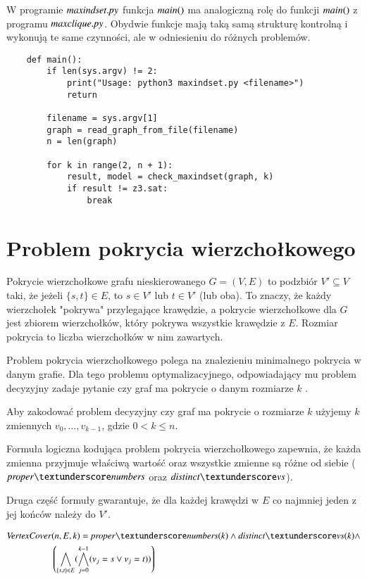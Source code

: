 

W programie ${\mathit{maxindset.py}}$ funkcja ${\mathit{main()}}$ ma analogiczną rolę do funkcji ${\mathit{main()}}$ z programu ${\mathit{maxclique.py}}$. Obydwie funkcje mają taką samą strukturę kontrolną i wykonują te same czynności, ale w odniesieniu do różnych problemów. 

\begin{lstlisting}
	def main():
		if len(sys.argv) != 2:
			print("Usage: python3 maxindset.py <filename>")
			return
		
		filename = sys.argv[1]
		graph = read_graph_from_file(filename)
		n = len(graph)
		
		for k in range(2, n + 1):
			result, model = check_maxindset(graph, k)
			if result != z3.sat:
				break
\end{lstlisting}


\section{Problem pokrycia wierzchołkowego}
Pokrycie wierzchołkowe grafu nieskierowanego $G = (V, E)$ to podzbiór $V' \subseteq V$ taki, że jeżeli $\{s, t\} \in E$, to $s \in V'$ lub $t \in V'$ (lub oba). To znaczy, że każdy wierzchołek "pokrywa" przylegające krawędzie, a pokrycie wierzchołkowe dla \(G\) jest zbiorem wierzchołków, który pokrywa wszystkie krawędzie z \(E\). Rozmiar pokrycia to liczba wierzchołków w nim zawartych.

Problem pokrycia wierzchołkowego polega na znalezieniu minimalnego pokrycia w danym grafie. Dla tego problemu optymalizacyjnego, odpowiadający mu problem decyzyjny zadaje pytanie czy graf ma pokrycie o danym rozmiarze \(k\) \cite{CormenLRS0023376}.

Aby zakodować problem decyzyjny czy graf ma pokrycie o rozmiarze $k$ użyjemy $k$ zmiennych $v_0,\ldots,v_{k-1}$,
gdzie $0 < k \leq n$.

Formuła logiczna kodująca problem pokrycia wierzchołkowego zapewnia, że każda zmienna przyjmuje właściwą wartość oraz wszystkie zmienne są różne od siebie ($\propernumbers$ oraz $\distinctvs$).

Druga część formuły gwarantuje, że dla każdej krawędzi w $E$ co najmniej jeden z jej końców należy do $V'$. 

\begin{align*}
	\VertexCover&(n, E, k) = \propernumbers(k) \land \distinctvs(k) \land \\
	&\left( \bigwedge_{\{s,t\} \in E} (\bigwedge_{j=0}^{k-1} (v_j = s \lor v_j = t)) \right)	
\end{align*}


